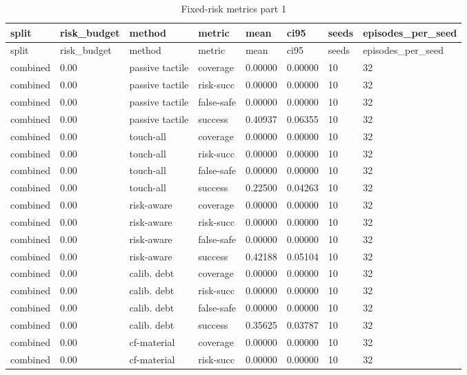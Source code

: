 \documentclass{article}
\begin{document}
\begin{center}
\tiny
\renewcommand{\arraystretch}{0.92}
\setlength{\tabcolsep}{3pt}
\begin{longtable}{llllllll}
\caption{Fixed-risk metrics part 1}\label{tab:fixed-risk-metrics-1}\\
\toprule
split & risk\_budget & method & metric & mean & ci95 & seeds & episodes\_per\_seed \\
\midrule
\endfirsthead
\toprule
split & risk\_budget & method & metric & mean & ci95 & seeds & episodes\_per\_seed \\
\midrule
\endhead
combined & 0.00 & passive tactile & coverage & 0.00000 & 0.00000 & 10 & 32 \\
combined & 0.00 & passive tactile & risk-succ & 0.00000 & 0.00000 & 10 & 32 \\
combined & 0.00 & passive tactile & false-safe & 0.00000 & 0.00000 & 10 & 32 \\
combined & 0.00 & passive tactile & success & 0.40937 & 0.06355 & 10 & 32 \\
combined & 0.00 & touch-all & coverage & 0.00000 & 0.00000 & 10 & 32 \\
combined & 0.00 & touch-all & risk-succ & 0.00000 & 0.00000 & 10 & 32 \\
combined & 0.00 & touch-all & false-safe & 0.00000 & 0.00000 & 10 & 32 \\
combined & 0.00 & touch-all & success & 0.22500 & 0.04263 & 10 & 32 \\
combined & 0.00 & risk-aware & coverage & 0.00000 & 0.00000 & 10 & 32 \\
combined & 0.00 & risk-aware & risk-succ & 0.00000 & 0.00000 & 10 & 32 \\
combined & 0.00 & risk-aware & false-safe & 0.00000 & 0.00000 & 10 & 32 \\
combined & 0.00 & risk-aware & success & 0.42188 & 0.05104 & 10 & 32 \\
combined & 0.00 & calib. debt & coverage & 0.00000 & 0.00000 & 10 & 32 \\
combined & 0.00 & calib. debt & risk-succ & 0.00000 & 0.00000 & 10 & 32 \\
combined & 0.00 & calib. debt & false-safe & 0.00000 & 0.00000 & 10 & 32 \\
combined & 0.00 & calib. debt & success & 0.35625 & 0.03787 & 10 & 32 \\
combined & 0.00 & cf-material & coverage & 0.00000 & 0.00000 & 10 & 32 \\
combined & 0.00 & cf-material & risk-succ & 0.00000 & 0.00000 & 10 & 32 \\

\end{longtable}
\end{center}
\end{document}
